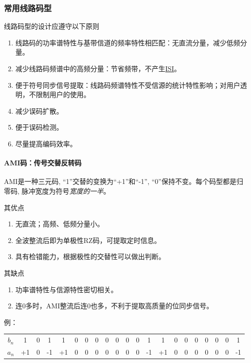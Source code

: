     \subsubsection{常用线路码型}
    线路码型的设计应遵守以下原则
    \begin{enumerate}[itemsep=0pt,parsep=0em,label=\color{bupt}\arabic*、,labelsep=0pt,leftmargin=4em]
        \item 线路码的功率谱特性与基带信道的频率特性相匹配：无直流分量，减少低频分量。
        \item 减少线路码频谱中的高频分量：节省频带，不产生\hyperref[subsubsec:ISI]{ISI}。
        \item 便于符号同步信号提取：线路码频谱特性不受信源的统计特性影响；对用户透明，不限制用户的使用。
        \item 减少误码扩散。
        \item 便于误码检测。
        \item 尽量提高编码效率。
    \end{enumerate}

    \paragraph{AMI码：传号交替反转码}\mbox{}

    AMI是一种三元码, “1”交替的变换为“+1”和“-1”, “0”保持不变。每个码型都是归零码, 脉冲宽度为符号\emph{宽度的一半}。

    其优点
    \begin{enumerate}[itemsep=0pt,parsep=0em,label=\color{bupt}\arabic*、,labelsep=0pt,leftmargin=4em]
        \item 无直流；高频、低频分量小。
        \item 全波整流后即为单极性RZ码，可提取定时信息。
        \item 具有检错能力，根据极性的交替性可以做出判断。
    \end{enumerate}

    其缺点
    \begin{enumerate}[itemsep=0pt,parsep=0em,label=\color{bupt}\arabic*、,labelsep=0pt,leftmargin=4em]
        \item 功率谱特性与信源特性密切相关。
        \item 连0多时，AMI整流后连0也多，不利于提取高质量的位同步信号。
    \end{enumerate}

    例：
    \begin{table}[H]
        \centering
        \begin{tabular}{c|*{19}{c}c}
            \textcolor{bupt}{$b_n$} &1 &0 &1 &1 &0 &0 &0 &0 &0 &0 &0 &1 &1 &0 &0 &0 &0 &0 &0 &1 \\ \Xhline{0.3pt}
            \textcolor{bupt}{$a_n$} &+1 &0 &-1 &+1 &0 &0 &0 &0 &0 &0 &0 &-1 &+1 &0 &0 &0 &0 &0 &0 &-1
        \end{tabular}
    \end{table}

